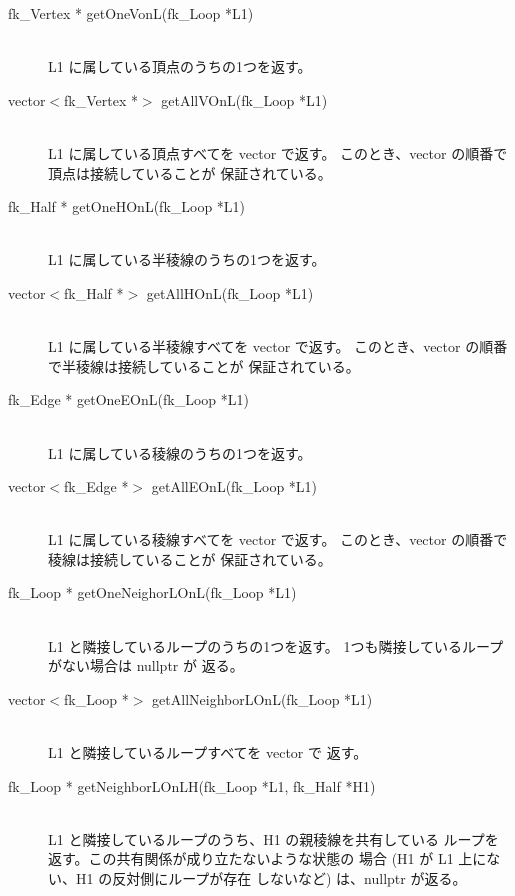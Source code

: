\begin{description}
 \item[\hspace*{0.6cm}fk\_Vertex * getOneVonL(fk\_Loop *L1)] ~ \\
	L1 に属している頂点のうちの1つを返す。

 \item[\hspace*{0.6cm}vector\(<\)fk\_Vertex *\(>\)
	getAllVOnL(fk\_Loop *L1)] ~ \\
	L1 に属している頂点すべてを vector で返す。
	このとき、vector の順番で頂点は接続していることが
	保証されている。

 \item[\hspace*{0.6cm}fk\_Half * getOneHOnL(fk\_Loop *L1)] ~ \\
	L1 に属している半稜線のうちの1つを返す。

 \item[\hspace*{0.6cm}vector\(<\)fk\_Half *\(>\)
	getAllHOnL(fk\_Loop *L1)] ~ \\
	L1 に属している半稜線すべてを vector で返す。
	このとき、vector の順番で半稜線は接続していることが
	保証されている。

 \item[\hspace*{0.6cm}fk\_Edge * getOneEOnL(fk\_Loop *L1)] ~ \\
	L1 に属している稜線のうちの1つを返す。

 \item[\hspace*{0.6cm}vector\(<\)fk\_Edge *\(>\)
	getAllEOnL(fk\_Loop *L1)] ~ \\
	L1 に属している稜線すべてを vector で返す。
	このとき、vector の順番で稜線は接続していることが
	保証されている。

 \item[\hspace*{0.6cm}fk\_Loop * getOneNeighorLOnL(fk\_Loop *L1)] ~ \\
	L1 と隣接しているループのうちの1つを返す。
	1つも隣接しているループがない場合は nullptr が
	返る。

 \item[\hspace*{0.6cm}vector\(<\)fk\_Loop *\(>\)
	getAllNeighborLOnL(fk\_Loop *L1)] ~ \\
	L1 と隣接しているループすべてを vector で
	返す。

 \item[\hspace*{0.6cm}fk\_Loop *
	getNeighborLOnLH(fk\_Loop *L1, fk\_Half *H1)] ~ \\
	L1 と隣接しているループのうち、H1 の親稜線を共有している
	ループを返す。この共有関係が成り立たないような状態の
	場合 (H1 が L1 上にない、H1 の反対側にループが存在
	しないなど) は、nullptr が返る。


\end{description}
